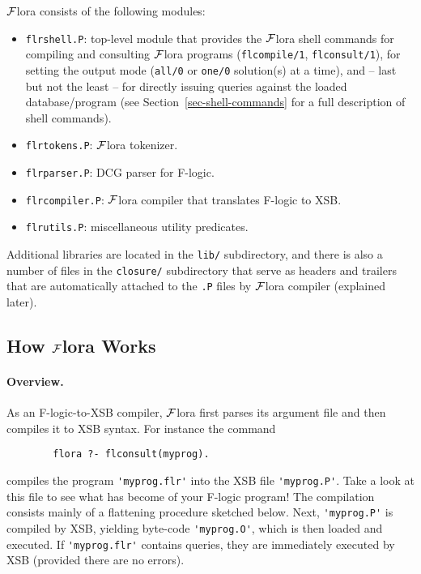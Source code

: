 \documentclass[11pt]{article}
\newcommand{\FLORA}{{\mbox{${\cal F}${\sc lora}}}\xspace}
\newcommand{\fl}{{F-logic}\xspace}
\begin{document}
\FLORA consists of the following modules:
\begin{itemize}
\item \texttt{flrshell.P}: top-level module that provides the \FLORA shell
  commands for compiling and consulting \FLORA programs
  (\texttt{flcompile/1}, \texttt{flconsult/1}), for setting the output mode
  (\texttt{all/0} or \texttt{one/0} solution(s) at a time), and -- last but
  not the least -- for directly issuing queries against the loaded
  database/program (see Section~\ref{sec-shell-commands} for a full
  description of shell commands).
\item \texttt{flrtokens.P}: \FLORA tokenizer.
\item \texttt{flrparser.P}: DCG parser for \fl.
\item \texttt{flrcompiler.P}: \FLORA compiler that translates \fl to XSB.
\item \texttt{flrutils.P}: miscellaneous utility predicates.
\end{itemize}
Additional libraries are located in the {\tt lib/} subdirectory, and there
is also a number of files in the {\tt closure/} subdirectory that serve as
headers and trailers that are automatically attached to the {\tt *.P} files by
\FLORA compiler (explained later).



\subsection{How \FLORA Works}



\paragraph{Overview.}

As an \fl-to-XSB compiler, \FLORA first parses its argument file and then
compiles it to XSB syntax. For instance the command
\begin{verbatim}
        flora ?- flconsult(myprog).
\end{verbatim}
compiles the program \verb|'myprog.flr'| into the XSB file
\verb|'myprog.P'|.  Take a look at this file to see what has become of your
F-logic program! The compilation consists mainly of a flattening procedure
sketched below.  Next, \verb|'myprog.P'| is compiled by XSB, yielding
byte-code \verb|'myprog.O'|, which is then loaded and executed.  If
\verb|'myprog.flr'| contains queries, they are immediately executed by XSB
(provided there are no errors).
\end{document}
